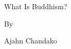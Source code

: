 \null
\vspace{3em}
{\HUGE What Is Buddhism? \par}
\vspace{3em}
{\LARGE By \par}
\vspace{0.5em}
{\LARGE Ajahn Chandako \par}
